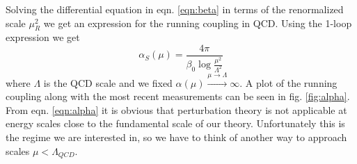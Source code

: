 Solving the differential equation in eqn. \ref{eqn:beta} in terms of the renormalized scale $\mu_R^2$ we get an expression for the running coupling in QCD. Using the 1-loop expression we get
\begin{equation}
\label{eqn:alpha}
\alpha_S(\mu) = \frac{4\pi}{\beta_0 \log\frac{\mu^2}{\Lambda^2}} 
\end{equation}
where $\Lambda$ is the QCD scale and we fixed $\alpha(\mu) \overset{\mu \rightarrow \Lambda}{\longrightarrow} \infty$. A plot of the running coupling along with the most recent measurements can be seen in fig. \ref{fig:alpha}. \\
From eqn. \ref{eqn:alpha} it is obvious that perturbation theory is not applicable at energy scales close to the fundamental scale of our theory. Unfortunately this is the regime we are interested in, so we have to think of another way to approach scales $\mu < \Lambda_{QCD}$. 
